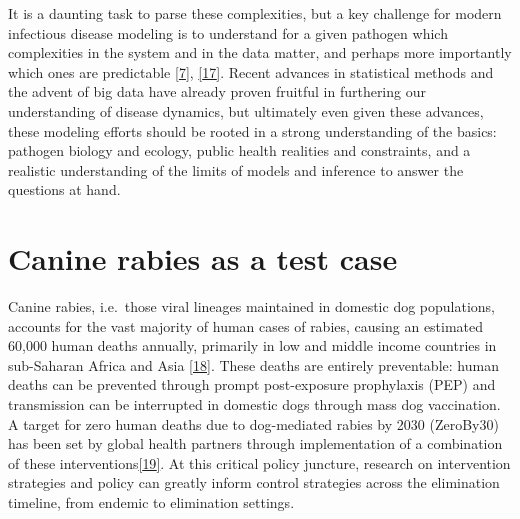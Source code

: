 \documentclass[
  oneside]{book}
\begin{document}
It is a daunting task to parse these complexities, but a key challenge for modern infectious disease modeling is to understand for a given pathogen which complexities in the system and in the data matter, and perhaps more importantly which ones are predictable \protect\hyperlink{ref-heesterbeek2015}{{[}7{]}}, \protect\hyperlink{ref-park2020}{{[}17{]}}. Recent advances in statistical methods and the advent of big data have already proven fruitful in furthering our understanding of disease dynamics, but ultimately even given these advances, these modeling efforts should be rooted in a strong understanding of the basics: pathogen biology and ecology, public health realities and constraints, and a realistic understanding of the limits of models and inference to answer the questions at hand.

\hypertarget{canine-rabies-as-a-test-case}{%
\section{Canine rabies as a test case}\label{canine-rabies-as-a-test-case}}

Canine rabies, i.e.~those viral lineages maintained in domestic dog populations, accounts for the vast majority of human cases of rabies, causing an estimated 60,000 human deaths annually, primarily in low and middle income countries in sub-Saharan Africa and Asia \protect\hyperlink{ref-hampson2015}{{[}18{]}}. These deaths are entirely preventable: human deaths can be prevented through prompt post-exposure prophylaxis (PEP) and transmission can be interrupted in domestic dogs through mass dog vaccination. A target for zero human deaths due to dog-mediated rabies by 2030 (ZeroBy30) has been set by global health partners through implementation of a combination of these interventions\protect\hyperlink{ref-abela-ridder2016}{{[}19{]}}. At this critical policy juncture, research on intervention strategies and policy can greatly inform control strategies across the elimination timeline, from endemic to elimination settings.
\end{document}
